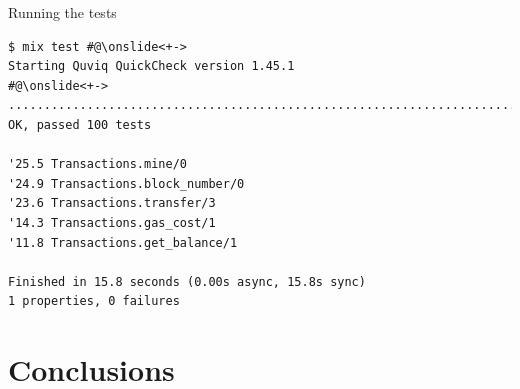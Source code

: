 \documentclass[aspectratio=169, 10pt]{beamer}
\begin{document}
\begin{frame}[label={sec:org479fd2a},fragile]{Running the tests}
 \onslide<+->
\onslide<+->
\lstset{language=bash,label= ,caption= ,captionpos=b,numbers=none,style=shell}
\begin{lstlisting}
$ mix test #@\onslide<+->
Starting Quviq QuickCheck version 1.45.1
#@\onslide<+->
....................................................................................................
OK, passed 100 tests

'25.5 Transactions.mine/0
'24.9 Transactions.block_number/0
'23.6 Transactions.transfer/3
'14.3 Transactions.gas_cost/1
'11.8 Transactions.get_balance/1

Finished in 15.8 seconds (0.00s async, 15.8s sync)
1 properties, 0 failures
\end{lstlisting}
\end{frame}

\section{Conclusions}
\label{sec:orgb0a7f49}
\end{document}
